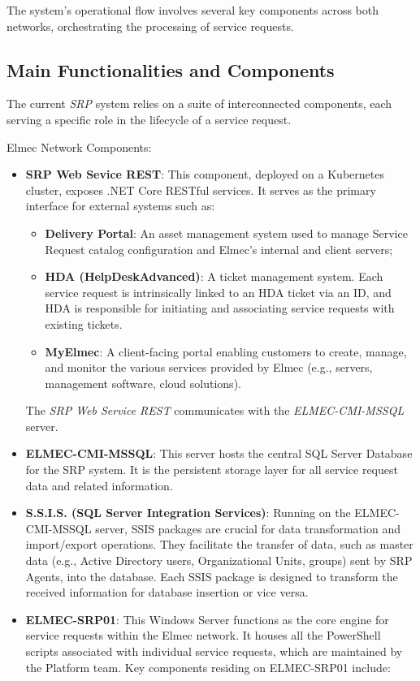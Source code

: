 The system's operational flow involves several key components across both networks, orchestrating the processing of service requests.

\subsection{Main Functionalities and Components}
The current \textit{SRP} system relies on a suite of interconnected components, each serving a specific role in the lifecycle of a service request.

Elmec Network Components:
\begin{itemize}
    \item \textbf{SRP Web Sevice REST}:  This component, deployed on a Kubernetes cluster, exposes .NET Core RESTful services. It serves as the primary interface for external systems such as:
    \begin{itemize}
        \item \textbf{Delivery Portal}: An asset management system used to manage Service Request catalog configuration and Elmec's internal and client servers;
        \item \textbf{HDA (HelpDeskAdvanced)}: A ticket management system. Each service request is intrinsically linked to an HDA ticket via an ID, and HDA is responsible for initiating and associating service requests with existing tickets.
        \item \textbf{MyElmec}: A client-facing portal enabling customers to create, manage, and monitor the various services provided by Elmec (e.g., servers, management software, cloud solutions).
    \end{itemize}
    The \textit{SRP Web Service REST} communicates with the \textit{ELMEC-CMI-MSSQL} server.
    \item \textbf{ELMEC-CMI-MSSQL}: This server hosts the central SQL Server Database for the SRP system. It is the persistent storage layer for all service request data and related information.
    \item \textbf{S.S.I.S. (SQL Server Integration Services)}: Running on the ELMEC-CMI-MSSQL server, SSIS packages are crucial for data transformation and import/export operations. They facilitate the transfer of data, such as master data (e.g., Active Directory users, Organizational Units, groups) sent by SRP Agents, into the database. Each SSIS package is designed to transform the received information for database insertion or vice versa.
    \item \textbf{ELMEC-SRP01}: This Windows Server functions as the core engine for service requests within the Elmec network. It houses all the PowerShell scripts associated with individual service requests, which are maintained by the Platform team. Key components residing on ELMEC-SRP01 include:

\end{itemize}
